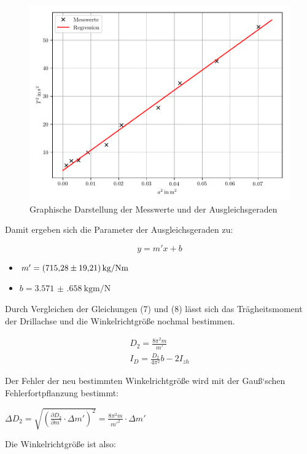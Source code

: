 \begin{figure}[H]
  \centering
  \includegraphics[width=\textwidth]{ausgleichsgerade1.pdf}
  \caption{Graphische Darstellung der Messwerte und der Ausgleichsgeraden}
\end{figure}

Damit ergeben sich die Parameter der Ausgleichsgeraden zu:

\begin{equation}
  y = m'x + b
\end{equation}

\begin{itemize}
  \item $m' = \SI{715.28(1921)}{\kilo\gram\per{\N\meter}}$
  \item $b = \SI{3.571(658)}{\kilo\gram\meter\per\N}$
\end{itemize}

Durch Vergleichen der Gleichungen (7) und (8) lässt sich das Trägheitsmoment der
Drillachse und die Winkelrichtgröße nochmal bestimmen.

\begin{gather}
  D_2 = \frac{8\pi^2m}{m'} \\
  I_D = \frac{D_2}{4\pi^2}b - 2I_{zh}
\end{gather}

Der Fehler der neu bestimmten Winkelrichtgröße wird mit der Gauß`schen Fehlerfortpflanzung
bestimmt:

$\Delta D_2 = \sqrt{\left(\frac{\partial D_2}{\partial m'} \cdot \Delta m' \right)^2}
= \frac{8\pi^2m}{m'^2} \cdot \Delta m'$

Die Winkelrichtgröße ist also:


